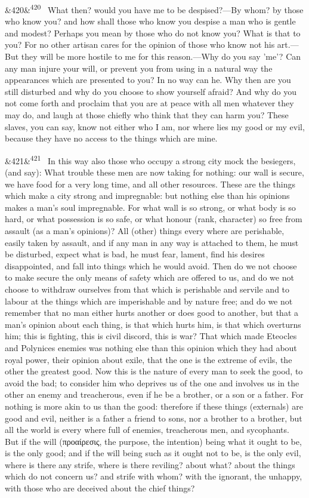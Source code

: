 \documentclass[12pt]{article}
\newcommand{\para}[1][]{\par\noindent\ifx&#1&\else\textsuperscript{\footnotesize #1}~\fi}
\begin{document}
\para[420] What then? would you have me to be despised?—By whom? by those who know you? and how shall those who know you despise a man who is gentle and modest? Perhaps you mean by those who do not know you? What is that to you? For no other artisan cares for the opinion of those who know not his art.—But they will be more hostile to me for this reason.—Why do you say 'me'? Can any man injure your will, or prevent you from using in a natural way the appearances which are presented to you? In no way can he. Why then are you still disturbed and why do you choose to show yourself afraid? And why do you not come forth and proclaim that you are at peace with all men whatever they may do, and laugh at those chiefly who think that they can harm you? These slaves, you can say, know not either who I am, nor where lies my good or my evil, because they have no access to the things which are mine.

\para[421] In this way also those who occupy a strong city mock the besiegers, (and say): What trouble these men are now taking for nothing: our wall is secure, we have food for a very long time, and all other resources. These are the things which make a city strong and impregnable: but nothing else than his opinions makes a man's soul impregnable. For what wall is so strong, or what body is so hard, or what possession is so safe, or what honour (rank, character) so free from assault (as a man's opinions)? All (other) things every where are perishable, easily taken by assault, and if any man in any way is attached to them, he must be disturbed, expect what is bad, he must fear, lament, find his desires disappointed, and fall into things which he would avoid. Then do we not choose to make secure the only means of safety which are offered to us, and do we not choose to withdraw ourselves from that which is perishable and servile and to labour at the things which are imperishable and by nature free; and do we not remember that no man either hurts another or does good to another, but that a man's opinion about each thing, is that which hurts him, is that which overturns him; this is fighting, this is civil discord, this is war? That which made Eteocles and Polynices enemies was nothing else than this opinion which they had about royal power, their opinion about exile, that the one is the extreme of evils, the other the greatest good. Now this is the nature of every man to seek the good, to avoid the bad; to consider him who deprives us of the one and involves us in the other an enemy and treacherous, even if he be a brother, or a son or a father. For nothing is more akin to us than the good: therefore if these things (externals) are good and evil, neither is a father a friend to sons, nor a brother to a brother, but all the world is every where full of enemies, treacherous men, and sycophants. But if the will (προαίρεσις, the purpose, the intention) being what it ought to be, is the only good; and if the will being such as it ought not to be, is the only evil, where is there any strife, where is there reviling? about what? about the things which do not concern us? and strife with whom? with the ignorant, the unhappy, with those who are deceived about the chief things?
\end{document}
